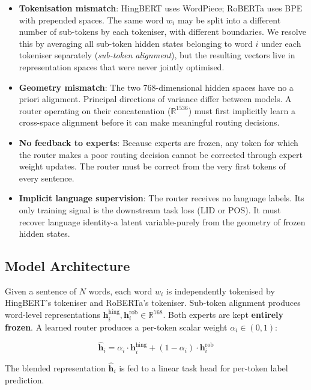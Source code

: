\documentclass[conference]{IEEEtran}
\begin{document}
\begin{itemize}
  \item \textbf{Tokenisation mismatch}: HingBERT uses WordPiece; RoBERTa uses BPE with prepended spaces. The same word $w_i$ may be split into a different number of sub-tokens by each tokeniser, with different boundaries. We resolve this by averaging all sub-token hidden states belonging to word $i$ under each tokeniser separately (\textit{sub-token alignment}), but the resulting vectors live in representation spaces that were never jointly optimised.
  \item \textbf{Geometry mismatch}: The two 768-dimensional hidden spaces have no a priori alignment. Principal directions of variance differ between models. A router operating on their concatenation ($\mathbb{R}^{1536}$) must first implicitly learn a cross-space alignment before it can make meaningful routing decisions.
  \item \textbf{No feedback to experts}: Because experts are frozen, any token for which the router makes a poor routing decision cannot be corrected through expert weight updates. The router must be correct from the very first tokens of every sentence.
  \item \textbf{Implicit language supervision}: The router receives no language labels. Its only training signal is the downstream task loss (LID or POS). It must recover language identity-a latent variable-purely from the geometry of frozen hidden states.
\end{itemize}

\subsection{Model Architecture}

Given a sentence of $N$ words, each word $w_i$ is independently tokenised by HingBERT's tokeniser and RoBERTa's tokeniser. Sub-token alignment produces word-level representations $\mathbf{h}^{\text{hing}}_i, \mathbf{h}^{\text{rob}}_i \in \mathbb{R}^{768}$. Both experts are kept \textbf{entirely frozen}. A learned router produces a per-token scalar weight $\alpha_i \in (0, 1)$:

\begin{equation}
    \hat{\mathbf{h}}_i = \alpha_i \cdot \mathbf{h}^{\text{hing}}_i + (1 - \alpha_i) \cdot \mathbf{h}^{\text{rob}}_i
\end{equation}

The blended representation $\hat{\mathbf{h}}_i$ is fed to a linear task head for per-token label prediction.
\end{document}
